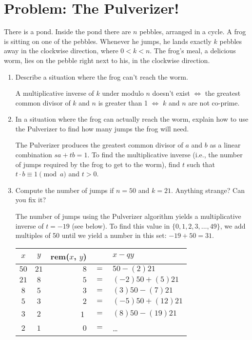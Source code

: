 \documentclass[a4paper]{article}
\begin{document}
	\section{Problem: The Pulverizer!}%
	\label{sec:Problem: The Pulverizer!}
	
	There is a pond. Inside the pond there are $n$ pebbles, arranged in a cycle. A
	frog is sitting on one of the pebbles. Whenever he jumps, he lands exactly $k$
	pebbles away in the clockwise direction, where $0 < k < n$. The frog’s meal, a
	delicious worm, lies on the pebble right next to his, in the clockwise
	direction.

	\begin{enumerate}[label=\textbf{(\alph*)}]
		\item Describe a situation where the frog can't reach the worm.

			A multiplicative inverse of $k$ under modulo $n$ doesn't exist $\iff$ the
			greatest common divisor of $k$ and $n$ is greater than 1 $\iff$ $k$ and $n$ are not co-prime.

		\item In a situation where the frog can actually reach the worm, explain
			how to use the Pulverizer to find how many jumps the frog will need.

			The Pulverizer produces the greatest common divisor of $a$ and $b$ as a
			linear combination $sa + tb = 1$. To find the multiplicative inverse
			(i.e., the number of jumps required by the frog to get to the worm), find
			$t$ such that $t \cdot b \equiv 1 \pmod{a}$ and $t > 0$.

		\item Compute the number of jumps if $n = 50$ and $k = 21$. Anything strange? Can you fix it?

			The number of jumps using the Pulverizer algorithm yields a
			multiplicative inverse of $t = -19$ (see below).  To find this value in $\{0, 1, 2,
			3, \ldots, 49 \}$, we add multiples of 50 until we yield a number in this
			set: $-19 + 50 = 31$.

			\begin{table}[h!]
			\centering
			\begin{tabular}[c]{ c c r c l }
				$x$ & $y$ & rem($x$, $y$) &  & $x - qy$ \\
				\hline
				$50$ & $21$ & $8$ & $=$ & $50 - (2)21$ \\
				$21$ & $8$ & $5$ & $=$ & $(-2)50 + (5)21$ \\
				$8$ & $5$ & $3$ & $=$ & $(3)50 - (7)21$ \\
				$5$ & $3$ & $2$ & $=$ & $(-5)50 + (12)21$ \\
				$3$ & $2$ & \textcircled{1} & $=$ & $(8)50 - (19)21$ \\
				$2$ & $1$ & $0$ & $=$ & \ldots \\
			\end{tabular}
			\end{table}
\end{enumerate}
\end{document}
